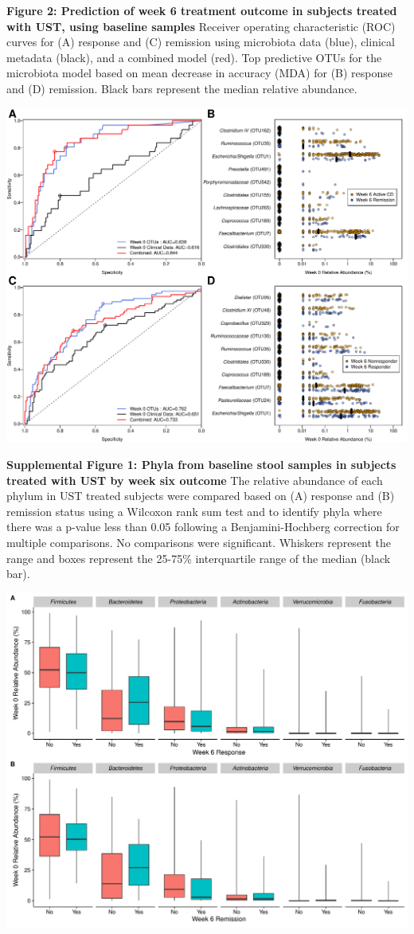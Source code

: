 \documentclass[12pt,]{article}
\begin{document}
\newpage

\textbf{Figure 2: Prediction of week 6 treatment outcome in subjects
treated with UST, using baseline samples} Receiver operating
characteristic (ROC) curves for (A) response and (C) remission using
microbiota data (blue), clinical metadata (black), and a combined model
(red). Top predictive OTUs for the microbiota model based on mean
decrease in accuracy (MDA) for (B) response and (D) remission. Black
bars represent the median relative abundance.

\includegraphics{figures/Figure2_wk0Xwk6pred.pdf}

\newpage

\textbf{Supplemental Figure 1: Phyla from baseline stool samples in
subjects treated with UST by week six outcome} The relative abundance of
each phylum in UST treated subjects were compared based on (A) response
and (B) remission status using a Wilcoxon rank sum test and to identify
phyla where there was a p-value less than 0.05 following a
Benjamini-Hochberg correction for multiple comparisons. No comparisons
were significant. Whiskers represent the range and boxes represent the
25-75\% interquartile range of the median (black bar).

\includegraphics{figures/SF1_wk6phyla.pdf}
\end{document}
